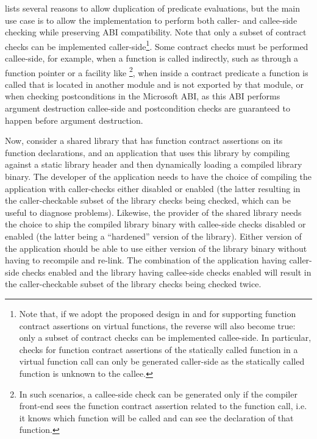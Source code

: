 \cite{P2751R1} lists several reasons to allow duplication of predicate evaluations, but the main use case is to allow the implementation to perform both caller- and callee-side checking while preserving ABI compatibility. Note that only a subset of contract checks can be implemented caller-side\footnote{Note that, if we adopt the proposed design in \cite{P3097R0} and \cite{P3165R0} for supporting function contract assertions on virtual functions, the reverse will also become true: only a subset of contract checks can be implemented callee-side. In particular, checks for function contract assertions of the statically called function in a virtual function call can only be generated caller-side as the statically called function is unknown to the callee.}. Some contract checks must be performed callee-side, for example, when a function is called indirectly, such as through a function pointer or a facility like \footnote{In such scenarios, a callee-side check can be generated only if the compiler front-end sees the function contract assertion related to the function call, i.e. it knows which function will be called and can see the declaration of that function.}, when inside a contract predicate a function is called that is located in another module and is not exported by that module, or when checking postconditions in the Microsoft ABI, as this ABI performs argument destruction callee-side and postcondition checks are guaranteed to happen before argument destruction. 

Now, consider a shared library that has function contract assertions on its function declarations, and an application that uses this library by compiling against a static library header and then dynamically loading a compiled library binary. The developer of the application needs to have the choice of compiling the application with caller-checks either disabled or enabled (the latter resulting in the caller-checkable subset of the library checks being checked, which can be useful to diagnose problems). Likewise, the provider of the shared library needs the choice to ship the compiled library binary with callee-side checks disabled or enabled (the latter being a ``hardened'' version of the library). Either version of the application should be able to use either version of the library binary without having to recompile and re-link. The combination of the application having caller-side checks enabled and the library having callee-side checks enabled will result in the caller-checkable subset of the library checks being checked twice.

